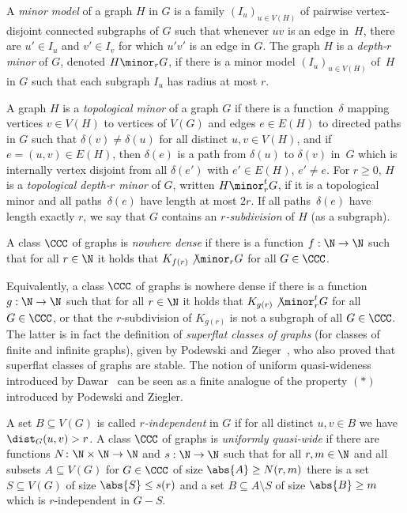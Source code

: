 \begin{definition}
A {\em{minor model}} of a graph $H$ in $G$ is a family $(I_u)_{u\in V(H)}$ of pairwise vertex-disjoint connected subgraphs of $G$
such that whenever $uv$ is an edge in~$H$, there are $u'\in I_u$ and $v'\in I_v$ for which $u'v'$ 
is an edge in $G$.
The graph $H$ is a {\em{depth-$r$ minor}} of $G$, denoted $H\minor_rG$, if there is a minor model
$(I_u)_{u\in V(H)}$ of~$H$ in $G$ such that each subgraph $I_u$ has radius at most $r$.

A graph $H$ is a \emph{topological minor} of a graph $G$ if there is a
function~$\delta$ mapping vertices $v\in V(H)$ to vertices of $V(G)$ and 
edges $e\in E(H)$ to directed paths in $G$ such that 
$\delta(v)\neq \delta(u)$ for all distinct $u,v\in V(H)$, and 
if $e=(u,v)\in E(H)$, then $\delta(e)$ is a path from 
$\delta(u)$ to $\delta(v)$ in~$G$ which is internally vertex disjoint from all 
$\delta(e')$ with $e'\in E(H)$, $e'\neq e$. 
For $r\geq 0$, $H$ is a \emph{topological depth-$r$ minor} of $G$, 
written $H\minor_r^tG$, if it is a topological minor and all paths~$\delta(e)$
have length at most $2r$. If all paths~$\delta(e)$ have length exactly
$r$, we say that $G$ contains an \emph{$r$-subdivision} of $H$ (as a 
subgraph). 
\end{definition}

\begin{definition}
A class $\CCC$ of graphs is \emph{nowhere dense} if there is a function 
$f:\N\rightarrow \N$ such that for all $r\in \N$ it holds that $K_{f(r)}\not\minor_r G$
for all $G\in \CCC$. 
\end{definition}

Equivalently, a 
class $\CCC$ of graphs is nowhere dense if there is a function 
$g:\N\rightarrow \N$ such that for all $r\in \N$ it holds that 
$K_{g(r)}\not\minor_r^t G$ for all $G\in \CCC$, or that the
$r$-subdivision of $K_{g(r)}$ is not a subgraph of all $G\in \CCC$. 
The latter is in fact the definition of \emph{superflat classes of graphs}
(for classes of finite and infinite graphs), 
given by Podewski and Zieger~\cite{podewski1978stable}, who also
proved that superflat classes of graphs are stable. 
The notion of uniform
quasi-wideness introduced by Dawar~\cite{dawar2010homomorphism}
can be seen as a finite analogue of the property 
$(\ast)$ introduced by Podewski and Ziegler. 

\begin{definition}
A set $B\subseteq V(G)$ is called {\em{$r$-independent}} in $G$ if for all
distinct $u,v\in B$ we have $\dist_G(u,v)>r$.
A class $\CCC$ of graphs is \emph{uniformly quasi-wide} if there are
functions $N\colon \N\times\N\rightarrow \N$ and $s:\N\rightarrow \N$ such
that for all $r,m\in \N$ and all subsets $A\subseteq V(G)$ for
$G\in \CCC$ of size $\abs{A}\geq N(r,m)$ there is a set
$S\subseteq V(G)$ of size $\abs{S}\leq s(r)$ and a set
$B\subseteq A\setminus S$ of size $\abs{B}\geq m$ which is $r$-independent in
$G-S$. 
\end{definition}

